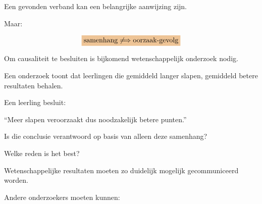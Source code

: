 \documentclass{ximera}
\begin{document}
\begin{oefening}{\oefU \ESS}
\begin{opmerking}
Een gevonden verband kan een belangrijke aanwijzing zijn.

Maar:

\[
\important{
\text{samenhang}
\not\Longrightarrow
\text{oorzaak-gevolg}
}
\]

Om causaliteit te besluiten is bijkomend wetenschappelijk onderzoek
nodig.
\end{opmerking}


\begin{oefening}{\oefU}

Een onderzoek toont dat leerlingen die gemiddeld langer slapen,
gemiddeld betere resultaten behalen.

Een leerling besluit:

\begin{center}
``Meer slapen veroorzaakt dus noodzakelijk betere punten.''
\end{center}

\begin{question}
Is die conclusie verantwoord op basis van alleen deze samenhang?

\begin{multipleChoice}
\end{multipleChoice}
\end{question}

\begin{question}
Welke reden is het best?

\begin{multipleChoice}
\end{multipleChoice}
\end{question}

\end{oefening}




Wetenschappelijke resultaten moeten zo duidelijk mogelijk
gecommuniceerd worden.

Andere onderzoekers moeten kunnen:


\end{oefening}
\end{document}

